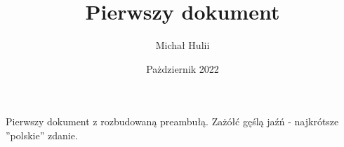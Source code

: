 \documentclass[12pt, b5paper]{article}
\title{Pierwszy dokument}
\author{Michał Hulii}
\date{Pażdziernik 2022}
\begin{document}
	Pierwszy dokument z rozbudowaną preambułą. Zażółć gęślą jaźń -
	najkrótsze ”polskie” zdanie.
\end{document}
